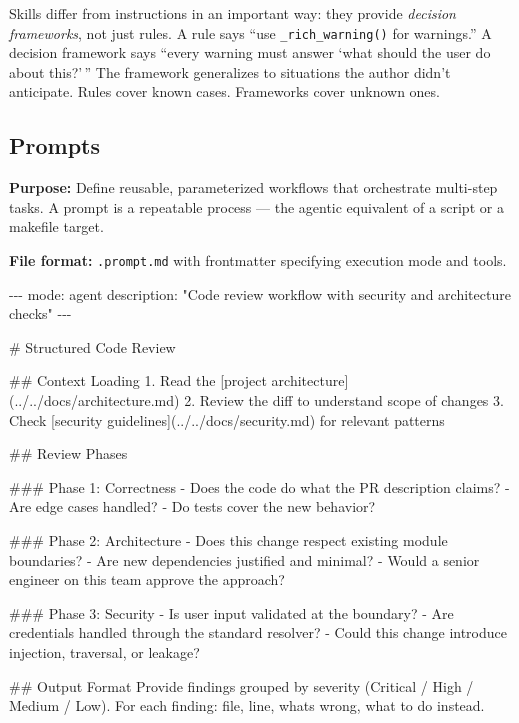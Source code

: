 \documentclass[
  a4paper,
  DIV=11,
  numbers=noendperiod]{scrreprt}
\newenvironment{Shaded}{\begin{snugshade}}{\end{snugshade}}
\newcommand{\AnnotationTok}[1]{\textcolor[rgb]{0.37,0.37,0.37}{#1}}
\newcommand{\CommentTok}[1]{\textcolor[rgb]{0.37,0.37,0.37}{#1}}
\newcommand{\FunctionTok}[1]{\textcolor[rgb]{0.28,0.35,0.67}{#1}}
\newcommand{\NormalTok}[1]{\textcolor[rgb]{0.00,0.23,0.31}{#1}}
\newcommand{\OtherTok}[1]{\textcolor[rgb]{0.00,0.23,0.31}{#1}}
\newcommand{\SpecialStringTok}[1]{\textcolor[rgb]{0.13,0.47,0.30}{#1}}
\begin{document}
Skills differ from instructions in an important way: they provide
\emph{decision frameworks}, not just rules. A rule says ``use
\texttt{\_rich\_warning()} for warnings.'' A decision framework says
``every warning must answer `what should the user do about this?'\,''
The framework generalizes to situations the author didn't anticipate.
Rules cover known cases. Frameworks cover unknown ones.

\subsection{Prompts}\label{prompts}

\textbf{Purpose:} Define reusable, parameterized workflows that
orchestrate multi-step tasks. A prompt is a repeatable process --- the
agentic equivalent of a script or a makefile target.

\textbf{File format:} \texttt{.prompt.md} with frontmatter specifying
execution mode and tools.

\begin{Shaded}
\begin{Highlighting}[]
\CommentTok{{-}{-}{-}}
\AnnotationTok{mode:}\CommentTok{ agent}
\AnnotationTok{description:}\CommentTok{ "Code review workflow with security and architecture checks"}
\CommentTok{{-}{-}{-}}

\FunctionTok{\# Structured Code Review}

\FunctionTok{\#\# Context Loading}
\SpecialStringTok{1. }\NormalTok{Read the }\CommentTok{[}\OtherTok{project architecture}\CommentTok{](../../docs/architecture.md)}
\SpecialStringTok{2. }\NormalTok{Review the diff to understand scope of changes}
\SpecialStringTok{3. }\NormalTok{Check }\CommentTok{[}\OtherTok{security guidelines}\CommentTok{](../../docs/security.md)}\NormalTok{ for relevant patterns}

\FunctionTok{\#\# Review Phases}

\FunctionTok{\#\#\# Phase 1: Correctness}
\SpecialStringTok{{-} }\NormalTok{Does the code do what the PR description claims?}
\SpecialStringTok{{-} }\NormalTok{Are edge cases handled?}
\SpecialStringTok{{-} }\NormalTok{Do tests cover the new behavior?}

\FunctionTok{\#\#\# Phase 2: Architecture}
\SpecialStringTok{{-} }\NormalTok{Does this change respect existing module boundaries?}
\SpecialStringTok{{-} }\NormalTok{Are new dependencies justified and minimal?}
\SpecialStringTok{{-} }\NormalTok{Would a senior engineer on this team approve the approach?}

\FunctionTok{\#\#\# Phase 3: Security}
\SpecialStringTok{{-} }\NormalTok{Is user input validated at the boundary?}
\SpecialStringTok{{-} }\NormalTok{Are credentials handled through the standard resolver?}
\SpecialStringTok{{-} }\NormalTok{Could this change introduce injection, traversal, or leakage?}

\FunctionTok{\#\# Output Format}
\NormalTok{Provide findings grouped by severity (Critical / High / Medium / Low).}
\NormalTok{For each finding: file, line, what\textquotesingle{}s wrong, what to do instead.}
\end{Highlighting}
\end{Shaded}
\end{document}
